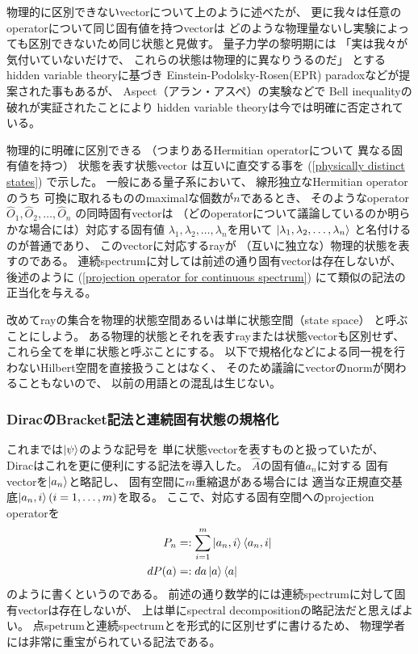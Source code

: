 物理的に区別できないvectorについて上のように述べたが、
更に我々は任意のoperatorについて同じ固有値を持つvectorは
どのような物理量ないし実験によっても区別できないため同じ状態と見做す。
量子力学の黎明期には
「実は我々が気付いていないだけで、
これらの状態は物理的に異なりうるのだ」
とするhidden variable theoryに基づき
Einstein-Podolsky-Rosen(EPR) paradoxなどが提案された事もあるが、
Aspect（アラン・アスペ）の実験などで
Bell inequalityの破れが実証されたことにより
hidden variable theoryは今では明確に否定されている。

物理的に明確に区別できる
（つまりあるHermitian operatorについて
異なる固有値を持つ）
状態を表す状態vector
は互いに直交する事を
(\ref{physically distinct states})
で示した。
一般にある量子系において、
線形独立なHermitian operatorのうち
可換に取れるもののmaximalな個数が$n$であるとき、
そのようなoperator
$\hat{O}_1,\hat{O}_2,\dots,\hat{O}_n$
の同時固有vectorは
（どのoperatorについて議論しているのか明らかな場合には）対応する固有値
$\lambda_1, \lambda_2, \dots , \lambda_n$を用いて
$\ket{\lambda_1, \lambda_2, \dots , \lambda_n}$
と名付けるのが普通であり、
このvectorに対応するrayが
（互いに独立な）物理的状態を表すのである。
連続spectrumに対しては前述の通り固有vectorは存在しないが、
後述のように
(\ref{projection operator for continuous spectrum})
にて類似の記法の正当化を与える。

改めてrayの集合を物理的状態空間あるいは単に状態空間（state space）
と呼ぶことにしよう。
ある物理的状態とそれを表すrayまたは状態vectorも区別せず、
これら全てを単に状態と呼ぶことにする。
以下で規格化などによる同一視を行わないHilbert空間を直接扱うことはなく、
そのため議論にvectorのnormが関わることもないので、
以前の用語との混乱は生じない。

\subsubsection{DiracのBracket記法と連続固有状態の規格化}

これまでは$\ket{\psi}$のような記号を
単に状態vectorを表すものと扱っていたが、
Diracはこれを更に便利にする記法を導入した。
$\hat{A}$の固有値$a_n$に対する
固有vectorを$\ket{a_n}$と略記し、
固有空間に$m$重縮退がある場合には
適当な正規直交基底$\ket{a_n,i}(i=1,\dots,m)$を取る。
ここで、対応する固有空間へのprojection operatorを
\begin{align}
    P_n &=: \sum_{i=1}^m \ket{a_n,i}\bra{a_n,i}
\\
    d P(a) &=: da \ket{a}\bra{a}
\label{projection operator for continuous spectrum}
\end{align}
のように書くというのである。
前述の通り数学的には連続spectrumに対して固有vectorは存在しないが、
上は単にspectral decompositionの略記法だと思えばよい。
点spetrumと連続spectrumとを形式的に区別せずに書けるため、
物理学者には非常に重宝がられている記法である。

